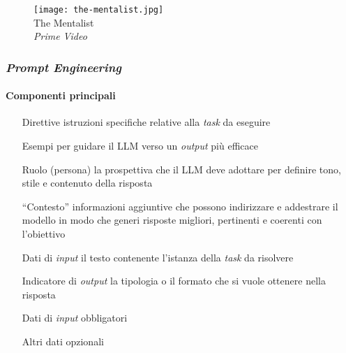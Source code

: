 \begin{frame}[t]
{\begin{minipage}[t]{\textwidth}
\begin{minipage}[t]{0.6\textwidth}
\begin{itemize}[leftmargin=10pt,align=right]
				\end{itemize}
            \end{minipage}
			\hfill
            \begin{minipage}[t]{0.4\textwidth}
                \centering
                \begin{figure}[ht]
                    \texttt{[image: the-mentalist.jpg]}
                    {\tiny\\The Mentalist\\\vspace*{-1pt}\textit{\textcopyright Prime Video}}
                \end{figure}
            \end{minipage}
	    \end{minipage}
	}
\end{frame}
%
\begin{frame}[t] \frametitle{\emph{Prompt Engineering}}
\framesubtitle{Componenti principali}
{\small
{}
    \begin{minipage}[t]{\textwidth}
        \begin{itemize}[leftmargin=70pt,align=right]
            \item[\alert{Direttive}] istruzioni specifiche relative alla \textit{task} da eseguire
            \item[\alert{Esempi}] per guidare il LLM verso un \textit{output} più efficace
            \item[\alert{Ruolo (persona)}] la prospettiva che il LLM deve adottare per definire tono, stile e contenuto della risposta
            \item[\alert{``Contesto''}] informazioni aggiuntive che possono indirizzare e addestrare il modello in modo che generi risposte migliori, pertinenti e coerenti con l'obiettivo
            \item[\alert{Dati di \emph{input}}] il testo contenente l'istanza della \textit{task} da risolvere
            \item[\alert{Indicatore di \emph{output}}] la tipologia o il formato che si vuole ottenere nella risposta
        \end{itemize}
        \vspace*{.5cm}
        \begin{itemize}[leftmargin=10pt,align=right]
            \item[\alert{\faArrowCircleRight}] Dati di \emph{input} obbligatori
            \item[\alert{\faArrowCircleRight}] Altri dati opzionali
        \end{itemize}
    \end{minipage}
}
\end{frame}
